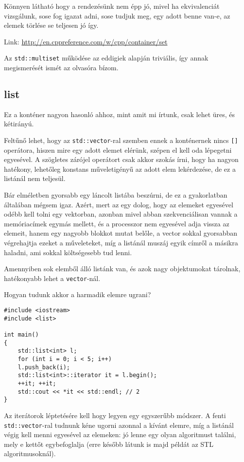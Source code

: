 \documentclass[a4paper,11.5pt]{article}
\begin{document}
	Könnyen látható hogy a rendezésünk nem épp jó, mivel ha ekvivalenciát vizsgálunk, sose fog igazat adni, sose tudjuk meg, egy adott benne van-e, az elemek törlése se teljesen jó így.
	
	Link: \url{http://en.cppreference.com/w/cpp/container/set}
	
	\begin{note}
		Az \texttt{std::multiset} működése az eddigiek alapján triviális, így annak megismerését ismét az olvasóra bízom.
	\end{note}
	\subsection{list}
	Ez a konténer nagyon hasonló ahhoz, mint amit mi írtunk, csak lehet üres, és kétirányú.
	\smallskip
	
	Feltűnő lehet, hogy az \texttt{std::vector}-ral szemben ennek a konténernek nincs \texttt{[]} operátora, hiszen mire egy adott elemet elérünk, szépen el kell oda lépegetni egyesével. A szögletes zárójel operátort csak akkor szokás írni, hogy ha nagyon hatékony, lehetőleg konstans műveletigényű az adott elem lekérdezése, de ez a listánál nem teljesül.
	\begin{note}
		Bár elméletben gyorsabb egy láncolt listába beszúrni, de ez a gyakorlatban általában mégsem igaz. Azért, mert az egy dolog, hogy az elemeket egyesével odébb kell tolni egy vektorban, azonban mivel abban szekvenciálisan vannak a memóriacímek egymás mellett, és a processzor nem egyesével adja vissza az elemeit, hanem egy nagyobb blokkot mutat belőle, a vector sokkal gyorsabban végrehajtja ezeket a műveleteket, míg a listánál muszáj egyik címről a másikra haladni, ami sokkal költségesebb tud lenni.
	\end{note}
	\begin{note}
		Amennyiben sok elemből álló listánk van, és azok nagy objektumokat tárolnak, hatékonyabb lehet a \texttt{vector}-nál.
	\end{note}
	Hogyan tudunk akkor a harmadik elemre ugrani?
	\begin{lstlisting}
#include <iostream>
#include <list>

int main()
{
	std::list<int> l;
	for (int i = 0; i < 5; i++)
	l.push_back(i);
	std::list<int>::iterator it = l.begin();
	++it; ++it;
	std::cout << *it << std::endl; // 2
}
	\end{lstlisting}	
	Az iterátorok léptetésére kell hogy legyen egy egyszerűbb módszer. A fenti \texttt{std::vector}-ral tudnunk kéne ugorni azonnal a kívánt elemre, míg a listánál végig kell menni egyesével az elemeken: jó lenne egy olyan algoritmust találni, mely e kettőt egybefoglalja (erre később látunk is majd példát az STL algoritmusoknál).
	
\end{document}

